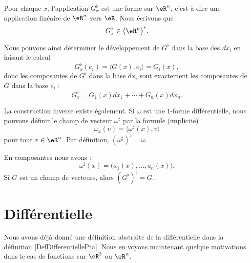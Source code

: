 Pour chaque $x$, l'application $G_x^{\flat}$ est une forme sur $\eR^n$, c'est-à-dire une application linéaire de $\eR^n$ vers $\eR$. Nous écrivons que
\begin{equation}
	G_x^{\flat}\in\big( \eR^n \big)^*.
\end{equation}

Nous pouvons ainsi déterminer le développement de $G^{\flat}$ dans la base des $dx_i$ en faisant le calcul
\begin{equation}
	G_x^{\flat}(e_i)=\langle G(x), e_i\rangle =G_i(x),
\end{equation}
donc les composantes de $G^{\flat}$ dans la base $dx_i$ sont exactement les composantes de $G$ dans la base $e_i$ :
\begin{equation}
	G^{\flat}_x=G_1(x)dx_1+\cdots+G_n(x)dx_n.
\end{equation}

La construction inverse existe également. Si $\omega$ est une $1$-forme différentielle, nous pouvons définir le champ de vecteur $\omega^{\sharp}$ par la formule (implicite)
\begin{equation}
	\omega_x(v)=\langle \omega^{\sharp}(x), v\rangle
\end{equation}
pour tout $v\in\eR^n$. Par définition, $(\omega^{\sharp})^{\flat}=\omega$.

\begin{lemma}
    En composantes nous avons :
	\begin{equation}
		\omega^{\sharp}(x)=\big( a_1(x),\ldots,a_n(x) \big).
	\end{equation}
	Si $G$ est un champ de vecteurs, alors $(G^{\flat})^{\sharp}=G$.
\end{lemma}

\section{Différentielle}

Nous avons déjà donné une définition abstraite de la différentielle dans la définition \ref{DefDifferentiellePta}. Nous en voyons maintenant quelque motivations dans le cas de fonctions sur \( \eR^2\) ou \( \eR^n\).

